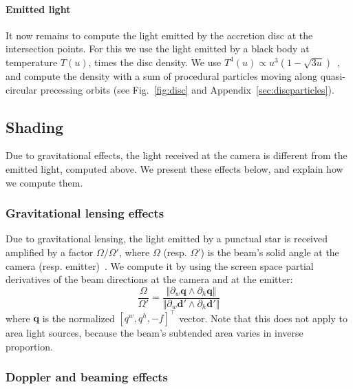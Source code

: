\documentclass{document}
\begin{document}
\paragraph*{Emitted light} It now remains to compute the light emitted by the 
accretion disc at the intersection points. For this we use the light emitted by 
a black body at temperature $T(u)$, times the disc density. We use $T^4(u) 
\propto u^3 (1 - \sqrt{3u})$~\cite{Lasota2016}, and compute the density with a 
sum of procedural particles moving along quasi-circular precessing orbits (see 
Fig.~\ref{fig:disc} and Appendix~\ref{sec:discparticles}).

\subsection{Shading}

Due to gravitational effects, the light received at the camera is different 
from the emitted light, computed above. We present these effects below, and 
explain how we compute them.

\subsubsection{Gravitational lensing effects}

Due to gravitational lensing, the light emitted by a punctual star is received 
amplified by a factor $\Omega / \Omega'$, where $\Omega$ (resp. $\Omega'$) is 
the beam's solid angle at the camera (resp. emitter)~\cite{Virbhadra99}. We 
compute it by using the screen space partial derivatives of the beam directions 
at the camera and at the emitter:
\begin{equation}
\frac{\Omega}{\Omega'} = 
    \frac{\Vert \partial_w \mathbf{q} \wedge \partial_h \mathbf{q} \Vert}
         {\Vert \partial_w \mathbf{d}' \wedge \partial_h \mathbf{d}' \Vert}
\end{equation}
where $\mathbf{q}$ is the normalized $[q^w, q^h, -f]^\top$ vector. Note that 
this does not apply to area light sources, because the beam's subtended area 
varies in inverse proportion.

\subsubsection{Doppler and beaming effects}
\end{document}

